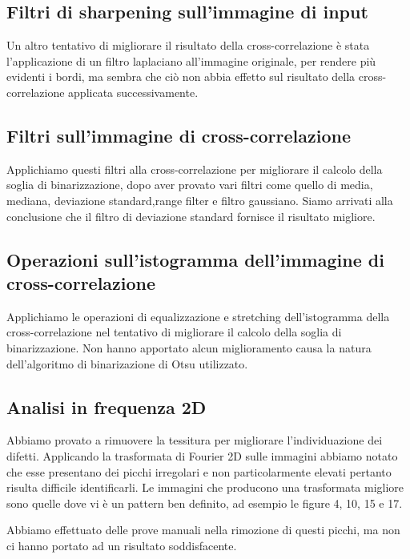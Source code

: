 \documentclass{article}
\begin{document}
\subsection{Filtri di sharpening sull'immagine di input}

Un altro tentativo di migliorare il risultato della cross-correlazione è stata l'applicazione di un filtro laplaciano all'immagine originale, per rendere
più evidenti i bordi, ma sembra che ciò non abbia effetto sul risultato della cross-correlazione
applicata successivamente.

\subsection{Filtri sull'immagine di cross-correlazione}

Applichiamo questi filtri alla cross-correlazione per migliorare il calcolo della soglia di
binarizzazione, dopo aver provato vari filtri come quello di media, mediana, deviazione standard,range filter e filtro gaussiano. Siamo arrivati alla conclusione che il filtro di deviazione
standard fornisce il risultato migliore.

\subsection{Operazioni sull'istogramma dell'immagine di cross-correlazione}

Applichiamo le operazioni di equalizzazione e stretching dell'istogramma della cross-correlazione nel tentativo di migliorare il calcolo della soglia di binarizzazione.
Non hanno apportato alcun miglioramento causa la natura dell'algoritmo di binarizazione di Otsu
utilizzato.

\subsection{Analisi in frequenza 2D}

Abbiamo provato a rimuovere la tessitura per migliorare l'individuazione dei difetti.
Applicando la trasformata di Fourier 2D sulle immagini abbiamo notato che esse presentano dei
picchi irregolari e non particolarmente elevati pertanto risulta difficile identificarli.
Le immagini che producono una trasformata migliore sono quelle dove vi è un pattern ben 
definito, ad esempio le figure 4, 10, 15 e 17.

Abbiamo effettuato delle prove manuali nella rimozione di questi picchi, ma non ci hanno portato ad un risultato soddisfacente.

\newpage
\end{document}

